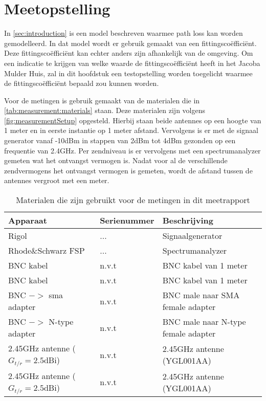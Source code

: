 \section{Meetopstelling} \label{sec:methods}
In \autoref{sec:introduction} is een model beschreven waarmee path loss kan worden gemodelleerd. In dat model wordt er gebruik gemaakt van een fittingscoëfficiënt. Deze fittingscoëfficiënt kan echter anders zijn afhankelijk van de omgeving. Om een indicatie te krijgen van welke waarde de fittingscoëfficiënt heeft in het Jacoba Mulder Huis, zal in dit hoofdstuk een testopstelling worden toegelicht waarmee de fittingscoëfficiënt bepaald zou kunnen worden.

Voor de metingen is gebruik gemaakt van de materialen die in \autoref{tab:measurement:materials} staan. Deze materialen zijn volgens \autoref{fig:measurementSetup} opgesteld. Hierbij staan beide antennes op een hoogte van 1 meter en in eerste instantie op 1 meter afstand. Vervolgens is er met de signaal generator vanaf -10dBm in stappen van 2dBm tot 4dBm gezonden op een frequentie van 2.4GHz. Per zendniveau is er vervolgens met een spectrumanalyzer gemeten wat het ontvangst vermogen is. Nadat voor al de verschillende zendvermogens het ontvangst vermogen is gemeten, wordt de afstand tussen de antennes vergroot met een meter. 
\begin{table}[ht]
    \centering
    \begin{tabular}{l|l|l}
        Apparaat                            & Serienummer   & Beschrijving \\\hline
        Rigol                               & ...           & Signaalgenerator \\
        Rhode\&Schwarz FSP                  & ...           & Spectrumanalyzer \\
        BNC kabel                           & n.v.t         & BNC kabel van 1 meter \\
        BNC kabel                           & n.v.t         & BNC kabel van 1 meter \\
        BNC $->$ sma adapter                & n.v.t         & BNC male naar SMA female adapter \\
        BNC $->$ N-type adapter             & n.v.t         & BNC male naar N-type female adapter \\
        2.45GHz antenne ($G_{t/r}=2.5$dBi)  & n.v.t         & 2.45GHz antenne (YGL001AA) \\
        2.45GHz antenne ($G_{t/r}=2.5$dBi)  & n.v.t         & 2.45GHz antenne (YGL001AA) \\\hline
    \end{tabular}
    \caption{Materialen die zijn gebruikt voor de metingen in dit meetrapport}
    \label{tab:measurement:materials}
\end{table}
